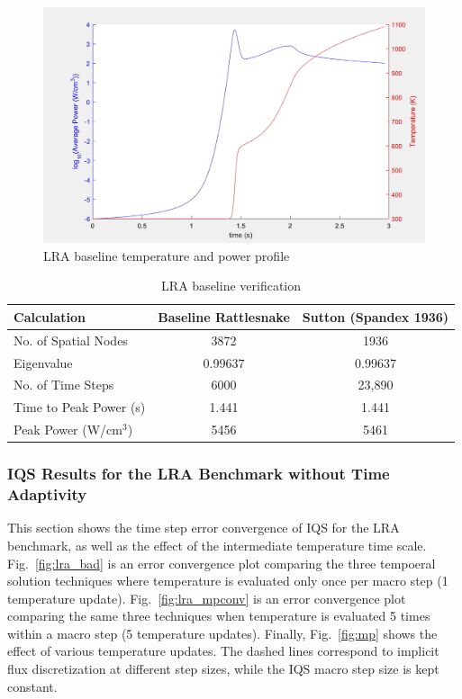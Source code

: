\documentclass{elsarticle}
\newcommand{\fig}[1]{Fig.~\ref{#1}}                      %
\begin{document}
\begin{figure}[htbp!]
\centering
\includegraphics[width=\linewidth]{figures/lra_profile.png}
\caption{LRA baseline temperature and power profile}
\label{fig:lra_profile}
\end{figure}

\begin{table}[!htbp]
\begin{center}
\caption{LRA baseline verification}
\label{tab:base}
\begin{tabular}{|l||c|c|}
\hline
Calculation   &  Baseline Rattlesnake & Sutton (Spandex 1936) \\
\hline\hline
No. of Spatial Nodes	& 3872 		& 1936 \\
Eigenvalue 				& 0.99637	& 0.99637 \\
No. of Time Steps 		& 6000 		& 23,890 \\
Time to Peak Power (s) 	& 1.441 	& 1.441 \\
Peak Power (W/cm$^3$) 	& 5456 		& 5461 \\
\hline
\end{tabular}
\end{center}
\end{table}

\subsubsection{IQS Results for the LRA Benchmark without Time Adaptivity}

This section shows the time step error convergence of IQS for the LRA benchmark, as well as the effect of the intermediate temperature time scale. \fig{fig:lra_bad} is an error convergence plot comparing the three tempoeral solution techniques where temperature is evaluated only once per macro step (1 temperature update).  \fig{fig:lra_mpconv} is an error convergence plot comparing the same three techniques when temperature is evaluated 5 times within a macro step (5 temperature updates).  Finally, \fig{fig:mp} shows the effect of various temperature updates. The dashed lines correspond to implicit flux discretization at different step sizes, while the IQS macro step size is kept constant.
\end{document}
